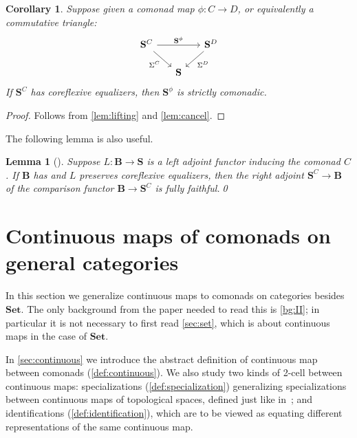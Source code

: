 \documentclass[11pt, oneside, article]{memoir}
\makeatletter
\theoremstyle{plain}
\newtheorem{corollary}[theorem]{Corollary}
\newtheorem{lemma}[theorem]{Lemma}
\theoremstyle{definition}
\theoremstyle{remark}
\def\theHsection{\theHchapter.\arabic{section}}
\def\theHtheorem{\theHsection.\arabic{theorem}}
\def\theHcorollary{\theHsection.\arabic{theorem}}
\def\theHproposition{\theHsection.\arabic{theorem}}
\def\theHlemma{\theHsection.\arabic{theorem}}
\def\theHconjecture{\theHsection.\arabic{theorem}}
\def\theHdefinition{\theHsection.\arabic{theorem}}
\def\theHmyremark{\theHsection.\arabic{theorem}}
\def\theHmyexample{\theHsection.\arabic{theorem}}
\def\theHmyconvention{\theHsection.\arabic{theorem}}
\def\theHmywarning{\theHsection.\arabic{theorem}}
\def\theHmycounterexample{\theHsection.\arabic{theorem}}
\def\theHdef{\theHsection.\arabic{theorem}}
\def\theHrem{\theHsection.\arabic{theorem}}
\let\@origchapter\chapter
\renewcommand{\thechapter}{\arabic{chapter}}
\newif\if@inappendixmode
\newcommand{\@syncthmdisplay}{%
  \global\let\thedef\thetheorem
  \global\let\therem\thetheorem
  \global\let\thedefinition\thetheorem
  \global\let\thelemma\thetheorem
  \global\let\thecorollary\thetheorem
  \global\let\theproposition\thetheorem
  \global\let\theconjecture\thetheorem
  \global\let\themyremark\thetheorem
  \global\let\themyexample\thetheorem
  \global\let\themyconvention\thetheorem
  \global\let\themywarning\thetheorem
  \global\let\themycounterexample\thetheorem
}
\newcommand{\@syncthmH}[1]{%
  \gdef\theHtheorem{#1}\gdef\theHcorollary{#1}\gdef\theHproposition{#1}%
  \gdef\theHlemma{#1}\gdef\theHconjecture{#1}\gdef\theHdefinition{#1}%
  \gdef\theHmyremark{#1}\gdef\theHmyexample{#1}\gdef\theHmyconvention{#1}%
  \gdef\theHmywarning{#1}\gdef\theHmycounterexample{#1}%
  \gdef\theHdef{#1}\gdef\theHrem{#1}%
}
\newcommand{\appendixsectionnumbering}{%
  \counterwithin*{theorem}{section}%
  \gdef\thetheorem{\thechapter.\arabic{section}.\arabic{theorem}}%
  \@syncthmdisplay
  \@syncthmH{\theHchapter.\arabic{section}.\arabic{theorem}}%
}
\renewcommand{\chapter}{%
  \if@inappendixmode%
    \renewcommand{\thechapter}{\Alph{chapter}}%
    \renewcommand{\theHchapter}{\Alph{chapter}}%
    \counterwithout*{theorem}{section}%
    \gdef\thetheorem{\thechapter.\arabic{theorem}}%
    \@syncthmdisplay
    \@syncthmH{\theHchapter.\arabic{theorem}}%
  \else
    \renewcommand{\thechapter}{\arabic{chapter}}%
    \renewcommand{\theHchapter}{\arabic{chapter}}%
  \fi
  \@origchapter
}
\newcommand{\namedcat}[1]{\mathbf{#1}}
\newcommand{\cat}[1]{\mathbf{#1}}
\newcommand{\Set}{\namedcat{Set}}
\newcommand{\CoalgOn}[2]{{#2}^{#1}}
\newcommand{\CoalgS}[1]{\CoalgOn{#1}{\bS}}
\newcommand{\carr}{\Sigma}
\newcommand{\car}[1]{\carr^{#1}}
\newcommand{\carC}{\car{\cC}}
\newcommand{\carD}{\car{\cD}}
\newcommand{\com}[2]{{#1}^{#2}}
\newcommand{\cmnd}[1]{{#1}}
\newcommand{\cC}{\cmnd{C}}
\newcommand{\cD}{\cmnd{D}}
\newcommand{\bB}{\cat{B}}
\newcommand{\bS}{\cat{S}}
\newcommand{\CS}{\CoalgS{\cC}}
\newcommand{\DS}{\CoalgS{\cD}}
\makeatother
\begin{document}

\begin{corollary}\label{lem:adjointlift}
  Suppose given a comonad map $\phi \colon \cC \to \cD$, or
  equivalently a commutative triangle:
  \[
    \begin{tikzcd}[column sep=15pt, row sep=15pt]
      \CS\ar[rr, "\com{\bS}{\phi}"]\ar[dr, "\carC"']&&\DS\ar[dl, "\carD"]\\
      &\bS
    \end{tikzcd}
  \]
  If $\CS$ has coreflexive equalizers, then $\com{\bS}{\phi}$ is
  strictly comonadic.
\end{corollary}
\begin{proof}
  Follows from \cref{lem:lifting} and \cref{lem:cancel}.
\end{proof}

The following lemma is also useful.

\begin{lemma}[{\cite[Theorem IV.4.2]{maclane-moerdijk}}]\label{lem:crepff}
  Suppose $L \colon \bB \to \bS$ is a left adjoint functor inducing the
  comonad $\cC$. If $\bB$ has and $L$ preserves coreflexive
  equalizers, then the right adjoint $\CS \to \bB$ of the comparison
  functor $\bB \to \CS$ is fully faithful.\qed
\end{lemma}

\chapter{Continuous maps of comonads on general categories}\label{sec:maps}
\appendixsectionnumbering
\appendixtocspace

In this section we generalize continuous maps to comonads on
categories besides $\Set$. The only background from the paper needed
to read this is \cref{bg:II}; in particular it is not necessary to
first read \cref{sec:set}, which is about continuous maps in the case of
$\Set$.

In \cref{sec:continuous} we introduce the abstract definition of
continuous map between comonads (\cref{def:continuous}). We also study
two kinds of 2-cell between continuous maps: specializations
(\cref{def:specialization}) generalizing specializations between
continuous maps of topological spaces, defined just like
in~\cite{garner:ionads}; and identifications
(\cref{def:identification}), which are to be viewed as equating
different representations of the same continuous map.
\end{document}

